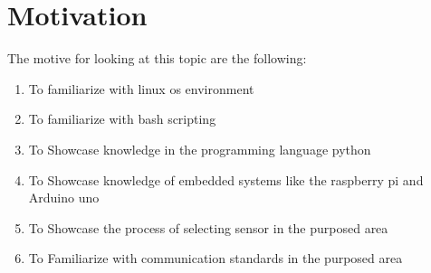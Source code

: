 
\section{Motivation}
\label{chpIntro-secMotive}
The motive for looking at this topic are the following:
\begin{enumerate}
    \item To familiarize with linux os environment
    \item To familiarize with bash scripting
    \item To Showcase knowledge in the programming language  python
    \item To Showcase knowledge of embedded systems like the raspberry pi and Arduino uno
    \item To Showcase the process of selecting sensor in the purposed area
    \item To Familiarize  with communication standards in the purposed area
\end{enumerate}
